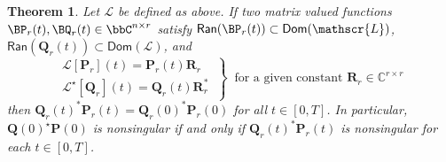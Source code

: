 \documentclass[pdflatex,sn-mathphys-num]{sn-jnl}%
\theoremstyle{thmstyleone}%
\newtheorem{theorem}{Theorem}%
\theoremstyle{thmstyletwo}%
\theoremstyle{thmstylethree}%
\def\Lop{\mathscr{L}}
\begin{document}
\begin{theorem} \label{thm:invSubspBases}
Let $\Lop$ be defined as above. If two matrix valued functions $\BP_r(t), \BQ_r(t)\in \bbC^{n\times r}$ satisfy $\mathsf{Ran}(\BP_r(t))\subset\mathsf{Dom}(\mathscr{L})$,
$\mathsf{Ran}(\mathbf{Q}_r(t))\subset\mathsf{Dom}(\mathscr{L})$, 
and
\begin{equation}
\label{leftrightInvariantSub}
\left.\begin{array}{c}
\mathscr{L}[\mathbf{P}_r](t)=\mathbf{P}_r(t)\mathbf{R}_{r}   \\[2mm]
\mathscr{L}^{\star}[\mathbf{Q}_r](t)=\mathbf{Q}_r(t)\mathbf{R}_{r}^{*}
\end{array}\ \right\}
\  \mbox{ for a given constant }  \mathbf{R}_r\in\mathbb{C}^{r\times r}  
\end{equation}
then $\mathbf{Q}_r(t)^{*}\mathbf{P}_r(t)=\mathbf{Q}_r(0)^{*}\mathbf{P}_r(0)$ for all $t\in[0,T]$. In particular,  $\mathbf{Q}(0)^{\star}\mathbf{P}(0)$ is nonsingular if and only if $\mathbf{Q}_r(t)^{*}\mathbf{P}_r(t)$ is nonsingular for each $t\in[0,T]$. 
\end{theorem}
\end{document}
